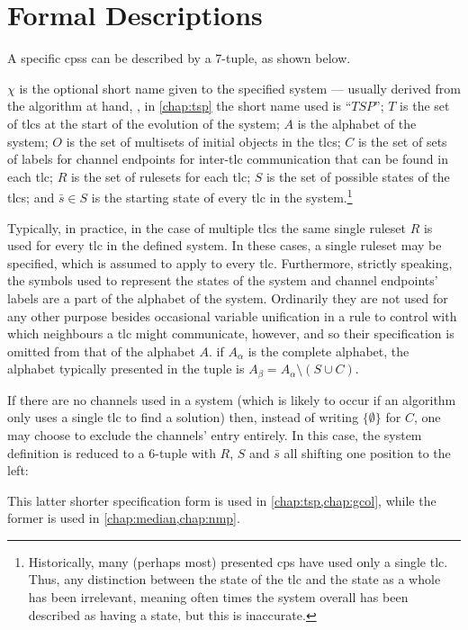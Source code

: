 \section{\label{sec:cps:formaldescriptions}Formal  Descriptions}

A specific \glspl{cps} can be described by a 7-tuple, as shown below.

\cptuplechanstemplate{}

\(\chi\) is the optional short name given to the specified system --- usually derived from the algorithm at hand, \eg{}, in \cref{chap:tsp} the short name used is \enquote{\(\mathit{TSP}\)};  \(T\) is the set of \glspl{tlc} at the start of the evolution of the system; \(A\) is the alphabet of the system; \(O\) is the set of multisets of initial objects in the \glspl{tlc};  \(C\) is the set of sets of labels for channel endpoints for inter-\gls{tlc} communication that can be found in each \gls{tlc};  \(R\) is the set of \glspl{ruleset} for each \gls{tlc}; \(S\) is the set of possible states of the \glspl{tlc}; and \(\bar{s} \in S\) is the starting state of every \gls{tlc} in the system.\footnote{Historically, many (perhaps most) presented \gls{cps} have used only a single \gls{tlc}.  Thus, any distinction between the state of the \gls{tlc} and the state as a whole has been irrelevant, meaning often times the system overall has been described as having a state, but this is inaccurate.}

Typically, in practice, in the case of multiple \glspl{tlc} the same single ruleset \(R\) is used for every \gls{tlc} in the defined system.  In these cases, a single ruleset may be specified, which is assumed to apply to every \gls{tlc}.  Furthermore, strictly speaking, the symbols used to represent the states of the system and channel endpoints' labels are a part of the alphabet of the system.  Ordinarily they are not used for any other purpose besides occasional variable unification in a rule to control with which neighbours a \gls{tlc} might communicate, however, and so their specification is omitted from that of the alphabet \(A\).  \Ie{} if \(A_\alpha\) is the complete alphabet, the alphabet typically presented in the tuple is \( A_\beta = A_\alpha \setminus (S \cup C) \).

If there are no channels used in a system (which is likely to occur if an algorithm only uses a single \gls{tlc} to find a solution) then, instead of writing \(\{\emptyset\}\) for \(C\), one may choose to exclude the channels' entry entirely.  In this case, the system definition is reduced to a 6-tuple with \(R\), \(S\) and \(\bar{s}\) all shifting one position to the left:

\cptupletemplate{}

This latter shorter specification form is used in \cref{chap:tsp,chap:gcol}, while the former is used in \cref{chap:median,chap:nmp}.